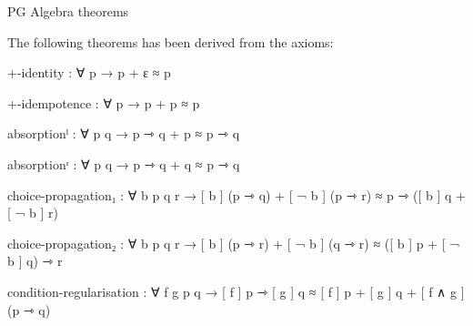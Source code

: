 \documentclass[12pt]{beamer}
\newcommand{\D}[1]{\blue{\mathsf{#1}}}
\newcommand{\C}[1]{\red{\mathsf{#1}}}
\newcommand{\seq}{\gg}
\begin{document}
\begin{frame}{PG Algebra theorems}

The following theorems has been derived from the axioms:

\begin{code}
+-identity : ∀ p → p + ε ≈ p

+-idempotence : ∀ p → p + p ≈ p

absorptionˡ : ∀ p q → p ⇾ q + p ≈ p ⇾ q

absorptionʳ : ∀ p q → p ⇾ q + q ≈ p ⇾ q

choice-propagation₁ : ∀ b p q r → 
  [ b ] (p ⇾ q) + [ ¬ b ] (p ⇾ r) ≈ p ⇾ ([ b ] q + [ ¬ b ] r) 

choice-propagation₂ : ∀ b p q r → 
  [ b ] (p ⇾ r) + [ ¬ b ] (q ⇾ r) ≈ ([ b ] p + [ ¬ b ] q) ⇾ r

condition-regularisation : ∀ f g p q → 
  [ f ] p ⇾ [ g ] q ≈ [ f ] p + [ g ] q + [ f ∧ g ] (p ⇾ q)
\end{code}
\end{frame}









\end{document}
